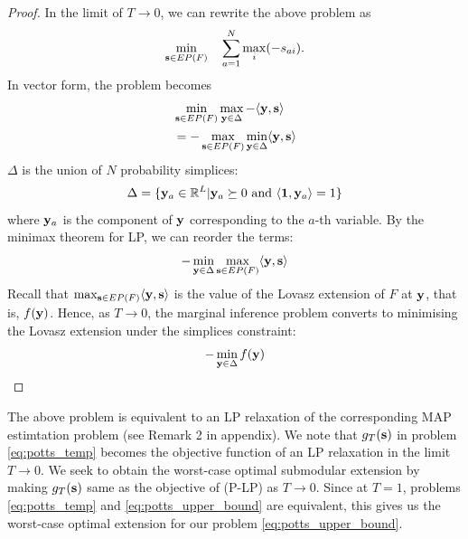 \begin{proof}
In the limit of $T \to 0$, we can rewrite the above problem as
\begin{equation}
    \min_{{\bf s} \in EP(F)} \quad \sum_{a = 1}^{N} \max_{i} (-s_{ai}).
\end{equation}
In vector form, the problem becomes
\begin{align}
    &\min_{{\bf s} \in EP(F)} \max_{{\bf y} \in \Delta} - \langle {\bf y}, {\bf s} \rangle \\
    & = - \max_{{\bf s} \in EP(F)} \min_{{\bf y} \in \Delta} \langle {\bf y}, {\bf s} \rangle
    \label{eq:maxmin}
\end{align}
$\Delta$ is the union of $N$ probability simplices:
\begin{equation}
    \Delta = \{{\bf y}_a \in \mathbb{R}^L | {\bf y}_a \succeq 0  \textrm{ and } \langle {\bf 1}, {\bf y}_a \rangle = 1\}
    \label{eq:delta2}
\end{equation}
where ${\bf y}_a$ is the component of $\bf y$ corresponding to the $a$-th variable. By the minimax theorem for LP, we can reorder the terms:
\begin{equation}
    - \min_{{\bf y} \in \Delta} \max_{{\bf s} \in EP(F)} \langle {\bf y}, {\bf s} \rangle 
    \label{eq:minmax}
\end{equation}
Recall that $\max_{{\bf s} \in EP(F)} \langle {\bf y}, {\bf s} \rangle$ is the value of the Lovasz extension of $F$ at $\bf y$, that is, $f({\bf y})$. Hence, as $T \to 0$, the marginal inference problem converts to minimising the Lovasz extension under the simplices constraint:
\begin{equation}
    - \min_{{\bf y} \in \Delta} f({\bf y}) 
    \label{eq:minLovasz}
\end{equation}
\end{proof}

The above problem is equivalent to an LP relaxation of the corresponding MAP estimtation problem (see Remark 2 in appendix). We note that $g_T ({\bf s})$ in problem \eqref{eq:potts_temp} becomes the objective function of an LP relaxation in the limit $T \to 0$. We seek to obtain the worst-case optimal submodular extension by making $g_T ({\bf s})$ same as the objective of (P-LP) as $T \to 0$. Since at $T = 1$, problems \eqref{eq:potts_temp} and \eqref{eq:potts_upper_bound} are equivalent, this gives us the worst-case optimal extension for our problem \eqref{eq:potts_upper_bound}. 


